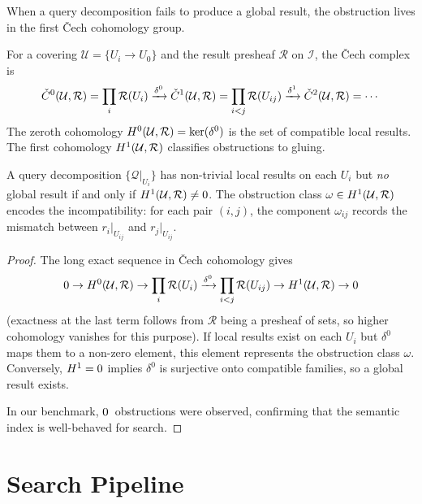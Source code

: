 \documentclass[11pt]{article}
\newcommand{\SemIndex}{\mathcal{I}}
\newcommand{\QuerySheaf}{\mathcal{Q}}
\newcommand{\ResultSheaf}{\mathcal{R}}
\newcommand{\ObstructionClass}{\omega}               %
\begin{document}
When a query decomposition fails to produce a global result, the
obstruction lives in the first \v{C}ech cohomology group.

\begin{definition}\label{def:cech-search}
For a covering $\mathcal{U} = \{U_i \to U_0\}$ and the result presheaf
$\ResultSheaf$ on $\SemIndex$, the \v{C}ech complex is
\[
  \Cech^{0}(\mathcal{U}, \ResultSheaf) =
    \prod_{i} \ResultSheaf(U_i)
  \xrightarrow{\delta^{0}}
  \Cech^{1}(\mathcal{U}, \ResultSheaf) =
    \prod_{i < j} \ResultSheaf(U_{ij})
  \xrightarrow{\delta^{1}}
  \Cech^{2}(\mathcal{U}, \ResultSheaf) = \cdots
\]
The zeroth cohomology $\Hcoh{0}(\mathcal{U}, \ResultSheaf) =
\ker(\delta^{0})$ is the set of compatible local results.
The first cohomology $\Hcoh{1}(\mathcal{U}, \ResultSheaf)$ classifies
obstructions to gluing.
\end{definition}

\begin{theorem}\label{thm:obstruction}
A query decomposition $\{\QuerySheaf|_{U_i}\}$ has non-trivial
local results on each $U_i$ but \emph{no} global result if and only if
$\Hcoh{1}(\mathcal{U}, \ResultSheaf) \neq 0$.  The obstruction class
$\ObstructionClass \in \Hcoh{1}(\mathcal{U}, \ResultSheaf)$ encodes
the incompatibility: for each pair $(i, j)$, the component
$\ObstructionClass_{ij}$ records the mismatch between $r_i|_{U_{ij}}$
and $r_j|_{U_{ij}}$.
\end{theorem}

\begin{proof}
The long exact sequence in \v{C}ech cohomology gives
\[
  0 \to \Hcoh{0}(\mathcal{U}, \ResultSheaf) \to
  \prod_{i} \ResultSheaf(U_i) \xrightarrow{\delta^{0}}
  \prod_{i<j} \ResultSheaf(U_{ij}) \to
  \Hcoh{1}(\mathcal{U}, \ResultSheaf) \to 0
\]
(exactness at the last term follows from $\ResultSheaf$ being a
presheaf of sets, so higher cohomology vanishes for this purpose).
If local results exist on each $U_i$ but $\delta^{0}$ maps them to a
non-zero element, this element represents the obstruction class
$\ObstructionClass$.  Conversely, $H^{1} = 0$ implies $\delta^{0}$
is surjective onto compatible families, so a global result exists.

In our benchmark, $0$~obstructions were observed,
confirming that the semantic index is well-behaved for search.
\end{proof}

\section{Search Pipeline}\label{sec:pipeline}
\end{document}
